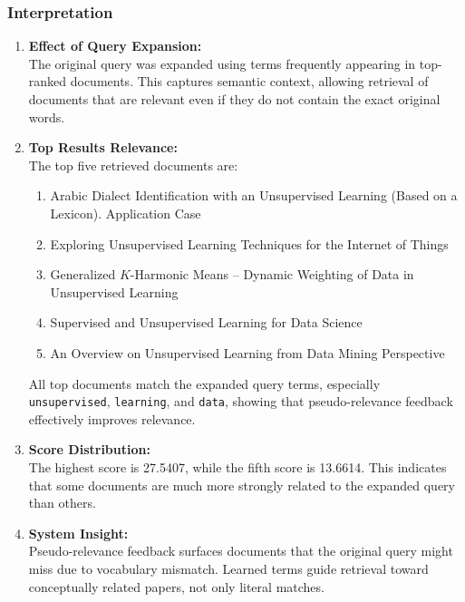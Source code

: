 \documentclass[a4paper,12pt]{article}
\begin{document}
  \subsubsection*{Interpretation}
   \begin{enumerate} 
   \item
   	 \textbf{Effect of Query Expansion:} 
   	 \\ The original query was expanded using terms frequently appearing in top-ranked documents. This captures semantic context, allowing retrieval of documents that are relevant even if they do not contain the exact original words.
 \item 
 	\textbf{Top Results Relevance:} \\
 	 The top five retrieved documents are:
 	 \begin{enumerate} 
 	 \item Arabic Dialect Identification with an Unsupervised Learning (Based on a Lexicon). Application Case
 	  \item Exploring Unsupervised Learning Techniques for the Internet of Things
 	   \item Generalized $K$-Harmonic Means -- Dynamic Weighting of Data in Unsupervised Learning 
 	   \item Supervised and Unsupervised Learning for Data Science 
 	   \item An Overview on Unsupervised Learning from Data Mining Perspective 
 	  \end{enumerate} 

All top documents match the expanded query terms, especially \texttt{unsupervised}, \texttt{learning}, and \texttt{data}, showing that pseudo-relevance feedback effectively improves relevance. 

\item 
	\textbf{Score Distribution:} \\ 
	The highest score is 27.5407, while the fifth score is 13.6614. This indicates that some documents are much more strongly related to the expanded query than others. 
\item 
	\textbf{System Insight:} \\ 
	Pseudo-relevance feedback surfaces documents that the original query might miss due to vocabulary mismatch. Learned terms guide retrieval toward conceptually related papers, not only literal matches.
  \end{enumerate} 
\end{document}

